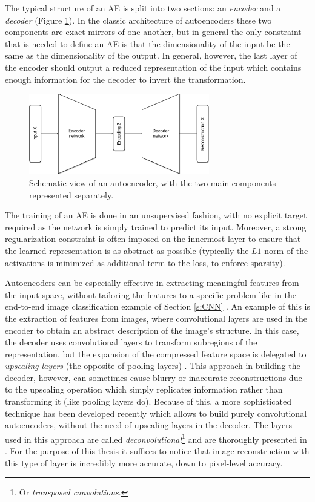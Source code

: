The typical structure of an AE is split into two sections: an 
\textit{encoder} and a \textit{decoder} (Figure \ref{f:autoencoder}). 
In the classic architecture of autoencoders these two components are exact 
mirrors of one another, but in general the only constraint that is needed to 
define an AE is that the dimensionality of the input be the same as the 
dimensionality of the output.
In general, however, the last layer of the encoder should output a reduced 
representation of the input which contains enough information for the decoder to
invert the transformation.
%
\begin{figure}
    \includegraphics[width=0.7\textwidth]{pictures/autoencoder}
    \centering
    \caption[Schematic view of an autoencoder]{Schematic view of an autoencoder, 
	    with the two main components represented separately.}
    \label{f:autoencoder}
\end{figure}
%

The training of an AE is done in an unsupervised fashion, with no
explicit target required as the network is simply trained to predict its input.
Moreover, a strong regularization constraint is often imposed on the innermost 
layer to ensure that the learned representation is as abstract as possible 
(typically the $L1$ norm of the activations is minimized as additional term to
 the loss, to enforce sparsity). 

Autoencoders can be especially effective in extracting meaningful
features from the input space, without tailoring the features to a specific 
problem like in the end-to-end image classification example of Section 
\ref{s:CNN} \cite{erhan2010does}. 
An example of this is the extraction of features from images, 
where convolutional layers are used in the encoder to obtain an abstract 
description of the image's structure. In this case, the decoder uses
convolutional layers to transform subregions of the representation, but the 
expansion of the compressed feature space is delegated to \textit{upscaling 
layers} (the opposite of pooling layers) \cite{masci2011cae}.
This approach in building the decoder, however, can sometimes cause blurry
or inaccurate reconstructions due to the upscaling operation which simply 
replicates information rather than transforming it (like pooling layers do).
Because of this, a more sophisticated technique has been developed recently 
which allows to build purely convolutional autoencoders, without the need of 
upscaling layers in the decoder.
The layers used in this approach are called \textit{deconvolutional}\footnote{Or
\textit{transposed convolutions}.} and are thoroughly presented in 
\cite{zeiler2010deconvolutional}. For the purpose of this thesis it suffices to 
notice that image reconstruction with this type of layer is incredibly more 
accurate, down to pixel-level accuracy.

